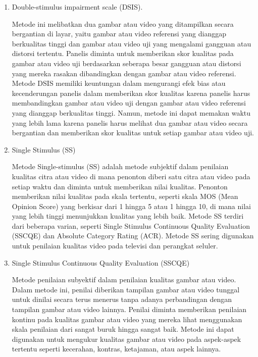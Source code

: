 \begin{enumerate}
	\item Double-stimulus impairment scale (DSIS). 
	
		Metode ini melibatkan dua gambar atau video yang ditampilkan secara bergantian di layar, yaitu gambar atau video referensi yang dianggap berkualitas tinggi dan gambar atau video uji yang mengalami gangguan atau distorsi tertentu. Panelis diminta untuk memberikan skor kualitas pada gambar atau video uji berdasarkan seberapa besar gangguan atau distorsi yang mereka rasakan dibandingkan dengan gambar atau video referensi. Metode DSIS memiliki keuntungan dalam mengurangi efek bias atau kecenderungan panelis dalam memberikan skor kualitas karena panelis harus membandingkan gambar atau video uji dengan gambar atau video referensi yang dianggap berkualitas tinggi. Namun, metode ini dapat memakan waktu yang lebih lama karena panelis harus melihat dua gambar atau video secara bergantian dan memberikan skor kualitas untuk setiap gambar atau video uji.
	
	\item Single Stimulus (SS)
	
		Metode Single-stimulus (SS) adalah metode subjektif dalam penilaian kualitas citra atau video di mana penonton diberi satu citra atau video pada setiap waktu dan diminta untuk memberikan nilai kualitas. Penonton memberikan nilai kualitas pada skala tertentu, seperti skala MOS (Mean Opinion Score) yang berkisar dari 1 hingga 5 atau 1 hingga 10, di mana nilai yang lebih tinggi menunjukkan kualitas yang lebih baik. Metode SS terdiri dari beberapa varian, seperti Single Stimulus Continuous Quality Evaluation (SSCQE) dan Absolute Category Rating (ACR). Metode SS sering digunakan untuk penilaian kualitas video pada televisi dan perangkat seluler.
		
		
	\item Single Stimulus Continuous Quality Evaluation (SSCQE) 
	
		Metode penilaian subyektif dalam penilaian kualitas gambar atau video. Dalam metode ini, penilai diberikan tampilan gambar atau video tunggal untuk dinilai secara terus menerus tanpa adanya perbandingan dengan tampilan gambar atau video lainnya. Penilai diminta memberikan penilaian kontinu pada kualitas gambar atau video yang mereka lihat menggunakan skala penilaian dari sangat buruk hingga sangat baik. Metode ini dapat digunakan untuk mengukur kualitas gambar atau video pada aspek-aspek tertentu seperti kecerahan, kontras, ketajaman, atau aspek lainnya.
		

\end{enumerate}
